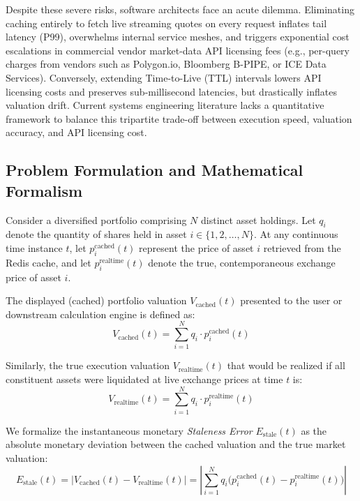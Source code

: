 \documentclass[11pt,a4paper]{article}
\begin{document}
Despite these severe risks, software architects face an acute dilemma. Eliminating caching entirely to fetch live streaming quotes on every request inflates tail latency (P99), overwhelms internal service meshes, and triggers exponential cost escalations in commercial vendor market-data API licensing fees (e.g., per-query charges from vendors such as Polygon.io, Bloomberg B-PIPE, or ICE Data Services). Conversely, extending Time-to-Live (TTL) intervals lowers API licensing costs and preserves sub-millisecond latencies, but drastically inflates valuation drift. Current systems engineering literature lacks a quantitative framework to balance this tripartite trade-off between execution speed, valuation accuracy, and API licensing cost.

\subsection{Problem Formulation and Mathematical Formalism}

Consider a diversified portfolio comprising $N$ distinct asset holdings. Let $q_i$ denote the quantity of shares held in asset $i \in \{1, 2, \dots, N\}$. At any continuous time instance $t$, let $p_i^{\text{cached}}(t)$ represent the price of asset $i$ retrieved from the Redis cache, and let $p_i^{\text{realtime}}(t)$ denote the true, contemporaneous exchange price of asset $i$.

The displayed (cached) portfolio valuation $V_{\text{cached}}(t)$ presented to the user or downstream calculation engine is defined as:
\begin{equation}
  V_{\text{cached}}(t) = \sum_{i=1}^{N} q_i \cdot p_i^{\text{cached}}(t)
  \label{eq:vcached}
\end{equation}

Similarly, the true execution valuation $V_{\text{realtime}}(t)$ that would be realized if all constituent assets were liquidated at live exchange prices at time $t$ is:
\begin{equation}
  V_{\text{realtime}}(t) = \sum_{i=1}^{N} q_i \cdot p_i^{\text{realtime}}(t)
  \label{eq:vrealtime}
\end{equation}

We formalize the instantaneous monetary \textit{Staleness Error} $E_{\text{stale}}(t)$ as the absolute monetary deviation between the cached valuation and the true market valuation:
\begin{equation}
  E_{\text{stale}}(t) = \bigl|V_{\text{cached}}(t) - V_{\text{realtime}}(t)\bigr|
    = \left|\sum_{i=1}^{N} q_i\bigl(p_i^{\text{cached}}(t)-p_i^{\text{realtime}}(t)\bigr)\right|
  \label{eq:estale}
\end{equation}
\end{document}
